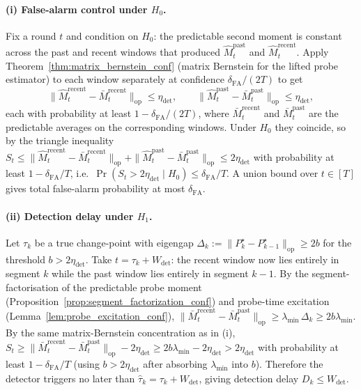 \documentclass{article}
\newcommand{\op}{\mathrm{op}}
\begin{document}
\paragraph{(i) False-alarm control under $H_0$.}
Fix a round $t$ and condition on $H_0$: the predictable second moment
is constant across the past and recent windows that produced
$\widehat M_t^{\mathrm{past}}$ and $\widehat M_t^{\mathrm{recent}}$.
Apply Theorem~\ref{thm:matrix_bernstein_conf} (matrix Bernstein for
the lifted probe estimator) to each window separately at confidence
$\delta_{\mathrm{FA}}/(2T)$ to get
\[
\bigl\|\widehat M_t^{\mathrm{recent}}-\bar M_t^{\mathrm{recent}}\bigr\|_{\op}
\le \eta_{\mathrm{det}},
\qquad
\bigl\|\widehat M_t^{\mathrm{past}}-\bar M_t^{\mathrm{past}}\bigr\|_{\op}
\le \eta_{\mathrm{det}},
\]
each with probability at least $1-\delta_{\mathrm{FA}}/(2T)$, where
$\bar M_t^{\mathrm{recent}}$ and $\bar M_t^{\mathrm{past}}$ are the
predictable averages on the corresponding windows. Under $H_0$ they
coincide, so by the triangle inequality
$S_t \le \|\widehat M_t^{\mathrm{recent}}-\bar M_t^{\mathrm{recent}}\|_{\op}+\|\widehat M_t^{\mathrm{past}}-\bar M_t^{\mathrm{past}}\|_{\op}\le 2\eta_{\mathrm{det}}$
with probability at least $1-\delta_{\mathrm{FA}}/T$, i.e.\
$\Pr(S_t>2\eta_{\mathrm{det}}\mid H_0)\le \delta_{\mathrm{FA}}/T$.
A union bound over $t\in[T]$ gives total false-alarm probability at
most $\delta_{\mathrm{FA}}$.

\paragraph{(ii) Detection delay under $H_1$.}
Let $\tau_k$ be a true change-point with eigengap
$\Delta_k:=\|P_k^\star-P_{k-1}^\star\|_{\op}\ge 2b$ for the
threshold $b>2\eta_{\mathrm{det}}$. Take $t=\tau_k+W_{\mathrm{det}}$:
the recent window now lies entirely in segment $k$ while the past
window lies entirely in segment $k-1$. By the segment-factorisation
of the predictable probe moment
(Proposition~\ref{prop:segment_factorization_conf}) and probe-time
excitation (Lemma~\ref{lem:probe_excitation_conf}),
$\|\bar M_t^{\mathrm{recent}}-\bar M_t^{\mathrm{past}}\|_{\op}
\ge \lambda_{\min}\,\Delta_k\ge 2b\lambda_{\min}$. By the same
matrix-Bernstein concentration as in (i),
$S_t \ge \|\bar M_t^{\mathrm{recent}}-\bar M_t^{\mathrm{past}}\|_{\op}-2\eta_{\mathrm{det}}\ge 2b\lambda_{\min}-2\eta_{\mathrm{det}}>2\eta_{\mathrm{det}}$
with probability at least $1-\delta_{\mathrm{FA}}/T$ (using
$b>2\eta_{\mathrm{det}}$ after absorbing $\lambda_{\min}$ into $b$).
Therefore the detector triggers no later than
$\widehat\tau_k=\tau_k+W_{\mathrm{det}}$, giving detection delay
$D_k\le W_{\mathrm{det}}$.
\end{document}
